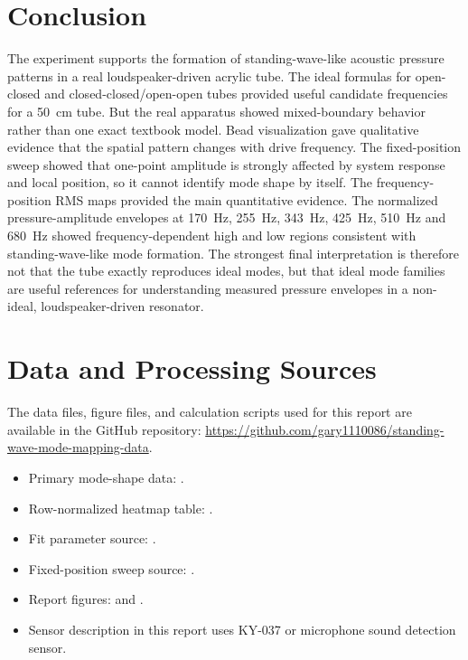 \documentclass[11pt,a4paper]{article}
\begin{document}
\section{Conclusion}

The experiment supports the formation of standing-wave-like acoustic pressure patterns in a real loudspeaker-driven acrylic tube. The ideal formulas for open-closed and closed-closed/open-open tubes provided useful candidate frequencies for a \SI{50}{cm} tube. But the real apparatus showed mixed-boundary behavior rather than one exact textbook model. Bead visualization gave qualitative evidence that the spatial pattern changes with drive frequency. The fixed-position sweep showed that one-point amplitude is strongly affected by system response and local position, so it cannot identify mode shape by itself. The frequency-position RMS maps provided the main quantitative evidence. The normalized pressure-amplitude envelopes at \SI{170}{Hz}, \SI{255}{Hz}, \SI{343}{Hz}, \SI{425}{Hz}, \SI{510}{Hz} and \SI{680}{Hz} showed frequency-dependent high and low regions consistent with standing-wave-like mode formation. The strongest final interpretation is therefore not that the tube exactly reproduces ideal modes, but that ideal mode families are useful references for understanding measured pressure envelopes in a non-ideal, loudspeaker-driven resonator.

\appendix
\section{Data and Processing Sources}

The data files, figure files, and calculation scripts used for this report are available in the GitHub repository:
\url{https://github.com/gary1110086/standing-wave-mode-mapping-data}.

\begin{itemize}
  \item Primary mode-shape data: .
  \item Row-normalized heatmap table: .
  \item Fit parameter source: .
  \item Fixed-position sweep source: .
  \item Report figures:  and .
  \item Sensor description in this report uses KY-037 or microphone sound detection sensor.
\end{itemize}
\end{document}
